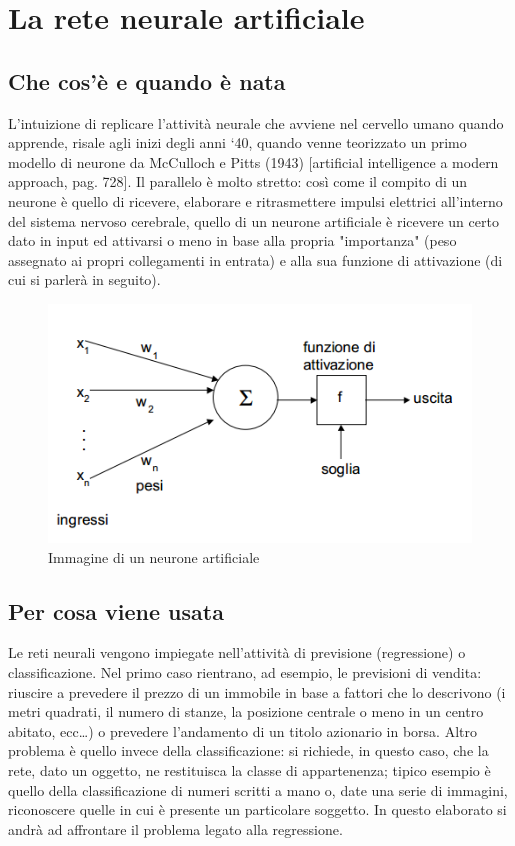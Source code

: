 \documentclass[12pt]{report}
\begin{document}
\tableofcontents

\chapter{La rete neurale artificiale}

\linespread{1.4}\selectfont
\section{Che cos’è e quando è nata}
L’intuizione di replicare l’attività neurale che avviene nel cervello umano quando apprende, risale agli inizi degli anni ‘40, quando venne teorizzato un primo modello di neurone da McCulloch e Pitts (1943) [artificial intelligence a modern approach, pag. 728]. Il parallelo è molto stretto: così come il compito di un neurone è quello di ricevere, elaborare e ritrasmettere impulsi elettrici all’interno del sistema nervoso cerebrale, quello di un neurone artificiale è ricevere un certo dato in input ed attivarsi o meno in base alla propria "importanza" (peso assegnato ai propri collegamenti in entrata) e alla sua funzione di attivazione (di cui si parlerà in seguito).

\begin{figure}
\begin{center}
\includegraphics[scale=0.75]{neurone_artificiale.png}
\caption{Immagine di un neurone artificiale}
\end{center}
\end{figure}

\section{Per cosa viene usata}
Le reti neurali vengono impiegate nell’attività di previsione (regressione) o classificazione.
Nel primo caso rientrano, ad esempio, le previsioni di vendita: riuscire a prevedere il prezzo di un immobile in base a fattori che lo descrivono (i metri quadrati, il numero di stanze, la posizione centrale o meno in un centro abitato, ecc…) o prevedere l’andamento di un titolo azionario in borsa.
Altro problema è quello invece della classificazione: si richiede, in questo caso, che la rete, dato un oggetto, ne restituisca la classe di appartenenza; tipico esempio è quello della classificazione di numeri scritti a mano o, date una serie di immagini, riconoscere quelle in cui è presente un particolare soggetto.
In questo elaborato si andrà ad affrontare il problema legato alla regressione.
\end{document}
